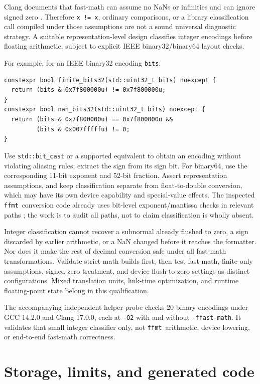 \documentclass[11pt,letterpaper]{article}
\newcommand{\ffmt}{\texttt{ffmt}}
\begin{document}
Clang documents that fast-math can assume no NaNs or infinities and can ignore
signed zero \cite{clang-fp}. Therefore \texttt{x != x}, ordinary comparisons,
or a library classification call compiled under those assumptions are not a
sound universal diagnostic strategy. A suitable representation-level design
classifies integer encodings before floating arithmetic, subject to explicit
IEEE binary32/binary64 layout checks.

For example, for an IEEE binary32 encoding \texttt{bits}:
\begin{lstlisting}
constexpr bool finite_bits32(std::uint32_t bits) noexcept {
  return (bits & 0x7f800000u) != 0x7f800000u;
}
constexpr bool nan_bits32(std::uint32_t bits) noexcept {
  return (bits & 0x7f800000u) == 0x7f800000u &&
         (bits & 0x007fffffu) != 0;
}
\end{lstlisting}

Use \texttt{std::bit\_cast} or a supported equivalent to obtain an encoding
without violating aliasing rules; extract the sign from its sign bit.
For binary64, use the corresponding 11-bit exponent and 52-bit fraction.
Assert representation assumptions, and keep classification separate from
float-to-double conversion, which may have its own device capability and
special-value effects. The inspected \ffmt\ conversion code already uses
bit-level exponent/mantissa checks in relevant paths \cite{ffmt-source};
the work is to audit all paths, not to claim classification is wholly absent.

Integer classification cannot recover a subnormal already flushed to zero,
a sign discarded by earlier arithmetic, or a NaN changed before it reaches
the formatter. Nor does it make the rest of decimal conversion safe under
all fast-math transformations. Validate strict-math builds first; then test
fast-math, finite-only assumptions, signed-zero treatment, and device
flush-to-zero settings as distinct configurations. Mixed translation units,
link-time optimization, and runtime floating-point state belong in this
qualification.

The accompanying independent helper probe checks 20 binary encodings under
GCC 14.2.0 and Clang 17.0.0, each at \texttt{-O2} with and without
\texttt{-ffast-math}. It validates that small integer classifier only, not
\ffmt\ arithmetic, device lowering, or end-to-end fast-math correctness.

\section{Storage, limits, and generated code}
\end{document}
